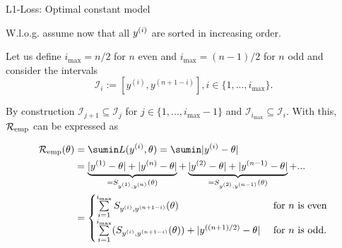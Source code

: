 \documentclass[11pt,compress,t,notes=noshow, xcolor=table]{beamer}
\begin{document}
\begin{framei}{L1-Loss: Optimal constant model}

  \item W.l.o.g. assume now that all $y^{(i)}$ are sorted in increasing order.

  \item Let us define $i_{\max} = n / 2$ for $n$ even and $i_{\max} = (n - 1) / 2$ for $n$ odd and consider the intervals 
  $$
    \mathcal{I}_i := [y^{(i)},y^{(n+1-i)}], i \in \{1, ..., i_{\max}\}. 
  $$

  \item By construction $\mathcal{I}_{j+1} \subseteq \mathcal{I}_j$ for $j \in \{1,\dots,i_{\max}-1\}$ and $\mathcal{I}_{i_{\max}} \subseteq \mathcal{I}_i$. With this, $\mathcal{R}_{\text{emp}}$ can be expressed as
  \begin{footnotesize}
  \begin{align*}
  \riske(\theta) &= \sumin L(\yi,\theta) = \sumin|\yi - \theta| \\ 
  &= \underbrace{|\yi[1] - \theta| + |\yi[n] - \theta|}_{= S_{\yi[1], \yi[n]}(\theta)} + \underbrace{|\yi[2] - \theta| + |\yi[n - 1] - \theta|}_{= S_{\yi[2], \yi[n - 1]}(\theta)} + ...  \\
  &= \begin{cases} \sum\limits_{i = 1}^{i_{\max}} S_{\yi, \yi[n + 1 - i]}(\theta) & \text{ for } n \text{ is even} \\
  \sum\limits_{i = 1}^{i_{\max}} (S_{\yi, \yi[n + 1 - i]}(\theta)) + |\yi[(n + 1)/2] - \theta| & \text{ for } n \text{ is odd}. \end{cases}
  \end{align*}
  \end{footnotesize}

\end{framei}
\end{document}
